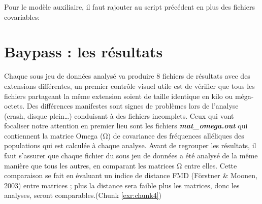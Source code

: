 \documentclass[
  openany]{book}
\newenvironment{Shaded}{\begin{snugshade}}{\end{snugshade}}
\newcommand{\CommentTok}[1]{\textcolor[rgb]{0.56,0.35,0.01}{\textit{#1}}}
\newcommand{\DataTypeTok}[1]{\textcolor[rgb]{0.13,0.29,0.53}{#1}}
\newcommand{\ExtensionTok}[1]{#1}
\newcommand{\NormalTok}[1]{#1}
\newcommand{\VariableTok}[1]{\textcolor[rgb]{0.00,0.00,0.00}{#1}}
\theoremstyle{definition}
\theoremstyle{definition}
\theoremstyle{definition}
\theoremstyle{definition}
\theoremstyle{remark}
\begin{document}
\begin{Shaded}
\end{Shaded}

Pour le modèle auxiliaire, il faut rajouter au script précédent en plus des fichiers covariables:

\begin{Shaded}
\end{Shaded}

\hypertarget{baypass-les-ruxe9sultats}{%
\chapter*{Baypass : les résultats}\label{baypass-les-ruxe9sultats}}

Chaque sous jeu de données analysé va produire 8 fichiers de résultats avec des extensions différentes, un premier contrôle visuel utile est de vérifier que tous les fichiers partageant la même extension soient de taille identique en kilo ou méga-octets. Des différences manifestes sont signes de problèmes lors de l'analyse (crash, disque plein\ldots) conduisant à des fichiers incomplets. Ceux qui vont focaliser notre attention en premier lieu sont les fichiers \textbf{\emph{mat\_omega.out}} qui contiennent la matrice Omega (Ω) de covariance des fréquences alléliques des populations qui est calculée à chaque analyse. Avant de regrouper les résultats, il faut s'assurer que chaque fichier du sous jeu de données a été analysé de la même manière que tous les autres, en comparant les matrices Ω entre elles.
Cette comparaison se fait en évaluant un indice de distance FMD (Förstner \& Moonen, 2003) entre matrices ; plus la distance sera faible plus les matrices, donc les analyses, seront comparables.(Chunk \ref{exr:chunk4})
\end{document}
